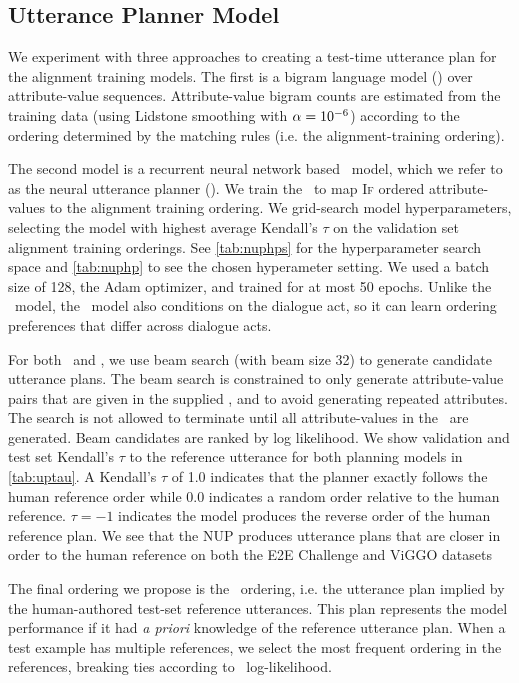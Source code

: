 \subsection{Utterance Planner Model} We experiment with three approaches to
creating a test-time utterance plan for the alignment training models. The
first is a bigram language model (\BgUP) over attribute-value sequences.
Attribute-value bigram counts are estimated from the training data 
(using Lidstone smoothing \citep{chen1996} with $\alpha=10^{-6}$)  according to the
ordering determined by the matching rules (i.e. the alignment-training ordering). 






The second model is a recurrent neural network based \sequencetosequence~model, which we refer to 
as the neural
utterance planner (\NUP). We train the \NUP~to map \textsc{If} ordered
attribute-values to the alignment training ordering. We grid-search model
hyperparameters, selecting the model with highest average Kendall's $\tau$
\citep{kendall1938} on the validation set alignment training orderings. See
\autoref{tab:nuphps} for the hyperparameter search space and \autoref{tab:nuphp} to see the chosen hyperameter setting. We used a batch size of 128, the Adam optimizer, and trained for at most 50 epochs.   Unlike the
\BgUP~model, the \NUP~model also conditions on the dialogue act, so it can
learn ordering preferences that differ across dialogue acts.

For both \BgUP~and \NUP, we use beam search (with beam size 32) to generate
candidate utterance plans. The beam search is constrained to only generate
attribute-value pairs that are given in the supplied \meaningrepresentation, and to avoid
generating repeated attributes. The search is not allowed to terminate until
all attribute-values in the \meaningrepresentation~are generated.  Beam candidates are ranked by
log likelihood. We show validation and test set Kendall's $\tau$ to the 
reference utterance for both planning models in \autoref{tab:uptau}.
A Kendall's $\tau$ of 1.0 indicates that the planner exactly follows the
human reference order while 0.0 indicates a random order relative to the
human reference. $\tau=-1$ indicates the model produces the reverse order
of the human reference plan. We see that the NUP produces utterance plans that are closer in order to the human reference on both the E2E Challenge and ViGGO datasets



The final ordering we propose is the \Oracle~ordering, i.e. the utterance plan
implied by the human-authored test-set reference utterances. This plan
represents the model performance if it had \textit{a priori}  knowledge of the
reference utterance plan. When a test example has multiple references, we
select the most frequent ordering in the references, breaking ties according
to \BgUP~log-likelihood.
